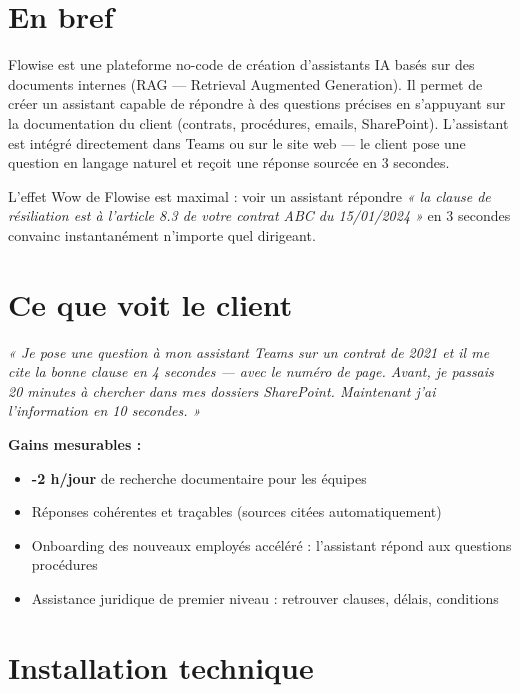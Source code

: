 \documentclass[11pt, a4paper]{article}
\begin{document}
\ficheHeader

\section*{En bref}
Flowise est une plateforme no-code de création d'assistants IA basés sur des documents internes (RAG — Retrieval Augmented Generation). Il permet de créer un assistant capable de répondre à des questions précises en s'appuyant sur la documentation du client (contrats, procédures, emails, SharePoint). L'assistant est intégré directement dans Teams ou sur le site web — le client pose une question en langage naturel et reçoit une réponse sourcée en 3 secondes.

\begin{pointcle}
  L'effet Wow de Flowise est maximal : voir un assistant répondre \textit{« la clause de résiliation est à l'article 8.3 de votre contrat ABC du 15/01/2024 »} en 3 secondes convainc instantanément n'importe quel dirigeant.
\end{pointcle}

\section{Ce que voit le client}

\begin{clientbox}
  \textit{« Je pose une question à mon assistant Teams sur un contrat de 2021 et il me cite la bonne clause en 4 secondes — avec le numéro de page. Avant, je passais 20 minutes à chercher dans mes dossiers SharePoint. Maintenant j'ai l'information en 10 secondes. »}
\end{clientbox}

\textbf{Gains mesurables :}
\begin{itemize}
  \item \textbf{-2 h/jour} de recherche documentaire pour les équipes
  \item Réponses cohérentes et traçables (sources citées automatiquement)
  \item Onboarding des nouveaux employés accéléré : l'assistant répond aux questions procédures
  \item Assistance juridique de premier niveau : retrouver clauses, délais, conditions
\end{itemize}

\section{Installation technique}
\end{document}
